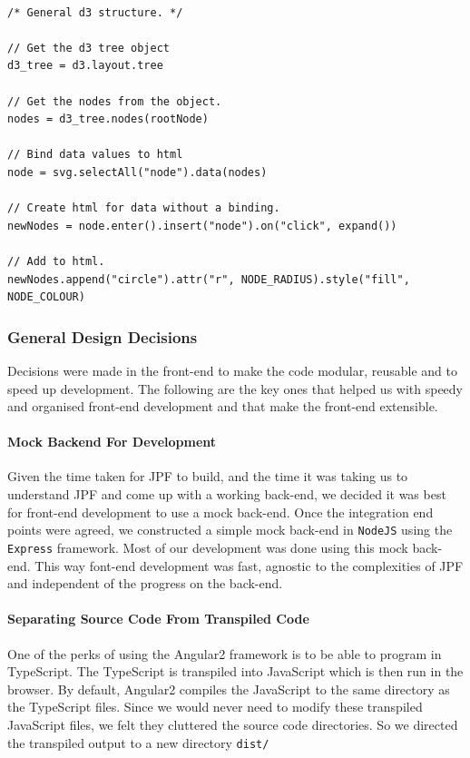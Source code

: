 \documentclass[titlepage,11pt]{article}
\begin{document}
\begin{lstlisting}

/* General d3 structure. */

// Get the d3 tree object
d3_tree = d3.layout.tree

// Get the nodes from the object.
nodes = d3_tree.nodes(rootNode)

// Bind data values to html 
node = svg.selectAll("node").data(nodes)

// Create html for data without a binding.
newNodes = node.enter().insert("node").on("click", expand())

// Add to html. 
newNodes.append("circle").attr("r", NODE_RADIUS).style("fill", NODE_COLOUR)
\end{lstlisting}

\subsubsection{General Design Decisions}
\noindent Decisions were made in the front-end to make the code modular, reusable and to speed up development. The following are the key ones that helped us with speedy and organised front-end development and that make the front-end extensible.

\paragraph{Mock Backend For Development}
\noindent Given the time taken for JPF to build, and the time it was taking us to understand JPF and come up with a working back-end, we decided it was best for front-end development to use a mock back-end. Once the integration end points were agreed, we constructed a simple mock back-end in \texttt{NodeJS} using the \texttt{Express} framework. Most of our development was done using this mock back-end. This way font-end development was fast, agnostic to the complexities of JPF and independent of the progress on the back-end.  

\paragraph{Separating Source Code From Transpiled Code}
\noindent One of the perks of using the Angular2 framework is to be able to program in TypeScript. The TypeScript is transpiled into JavaScript which is then run in the browser. By default, Angular2 compiles the JavaScript to the same directory as the TypeScript files. Since we would never need to modify these transpiled JavaScript files, we felt they cluttered the source code directories. So we directed the transpiled output to a new directory \texttt{dist/}
\end{document}

